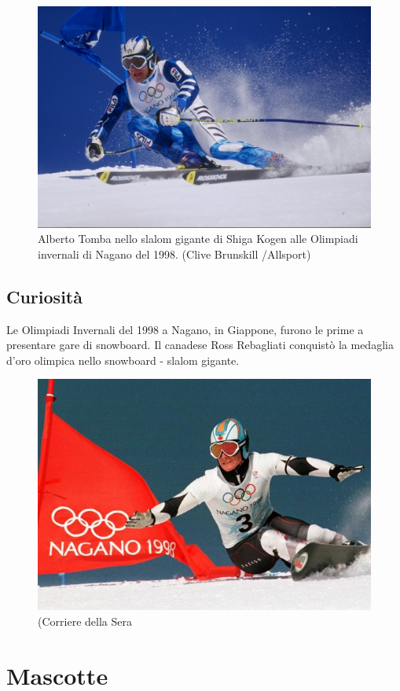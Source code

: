 \documentclass[
]{book}
\begin{document}
\begin{figure}
\includegraphics[width=0.8\linewidth]{images/IlPost/1998(2)} \caption{Alberto Tomba nello slalom gigante di Shiga Kogen alle Olimpiadi invernali di Nagano del 1998. (Clive Brunskill /Allsport)}\label{fig:unnamed-chunk-64}
\end{figure}

\subsection*{Curiosità}\label{curiosituxe0-5}

Le Olimpiadi Invernali del 1998 a Nagano, in Giappone, furono le prime a presentare gare di snowboard. Il canadese Ross Rebagliati conquistò la medaglia d'oro olimpica nello snowboard - slalom gigante.

\begin{figure}
\includegraphics[width=0.8\linewidth]{images/corriere/1998} \caption{(Corriere della Sera}\label{fig:unnamed-chunk-65}
\end{figure}

\section*{Mascotte}\label{mascotte-7}
\end{document}
